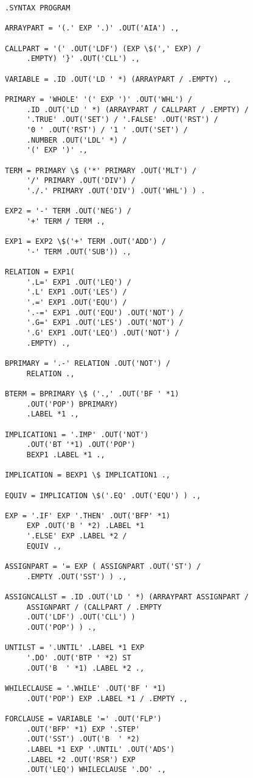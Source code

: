 \documentclass[twocolumn]{article}
\begin{document}
\begin{verbatim}
.SYNTAX PROGRAM

ARRAYPART = '(.' EXP '.)' .OUT('AIA') .,

CALLPART = '(' .OUT('LDF') (EXP \$(',' EXP) /
     .EMPTY) '}' .OUT('CLL') .,

VARIABLE = .ID .OUT('LD ' *) (ARRAYPART / .EMPTY) .,

PRIMARY = 'WHOLE' '(' EXP ')' .OUT('WHL') /
     .ID .OUT('LD ' *) (ARRAYPART / CALLPART / .EMPTY) /
     '.TRUE' .OUT('SET') / '.FALSE' .OUT('RST') /
     '0 ' .OUT('RST') / '1 ' .OUT('SET') /
     .NUMBER .OUT('LDL' *) /
     '(' EXP ')' .,

TERM = PRIMARY \$ ('*' PRIMARY .OUT('MLT') /
     '/' PRIMARY .OUT('DIV') /
     './.' PRIMARY .OUT('DIV') .OUT('WHL') ) .

EXP2 = '-' TERM .OUT('NEG') /
     '+' TERM / TERM .,

EXP1 = EXP2 \$('+' TERM .OUT('ADD') /
     '-' TERM .OUT('SUB')) .,

RELATION = EXP1(
     '.L=' EXP1 .OUT('LEQ') /
     '.L' EXP1 .OUT('LES') /
     '.=' EXP1 .OUT('EQU') /
     '.-=' EXP1 .OUT('EQU') .OUT('NOT') /
     '.G=' EXP1 .OUT('LES') .OUT('NOT') /
     '.G' EXP1 .OUT('LEQ') .OUT('NOT') /
     .EMPTY) .,

BPRIMARY = '.-' RELATION .OUT('NOT') /
     RELATION .,

BTERM = BPRIMARY \$ ('.,' .OUT('BF ' *1)
     .OUT('POP') BPRIMARY)
     .LABEL *1 .,

IMPLICATION1 = '.IMP' .OUT('NOT')
     .OUT('BT '*1) .OUT('POP')
     BEXP1 .LABEL *1 .,

IMPLICATION = BEXP1 \$ IMPLICATION1 .,

EQUIV = IMPLICATION \$('.EQ' .OUT('EQU') ) .,

EXP = '.IF' EXP '.THEN' .OUT('BFP' *1)
     EXP .OUT('B ' *2) .LABEL *1
     '.ELSE' EXP .LABEL *2 /
     EQUIV .,

ASSIGNPART = '= EXP ( ASSIGNPART .OUT('ST') /
     .EMPTY .OUT('SST') ) .,

ASSIGNCALLST = .ID .OUT('LD ' *) (ARRAYPART ASSIGNPART /
     ASSIGNPART / (CALLPART / .EMPTY
     .OUT('LDF') .OUT('CLL') )
     .OUT('POP') ) .,

UNTILST = '.UNTIL' .LABEL *1 EXP
     '.DO' .OUT('BTP ' *2) ST
     .OUT('B  ' *1) .LABEL *2 .,

WHILECLAUSE = '.WHILE' .OUT('BF ' *1)
     .OUT('POP') EXP .LABEL *1 / .EMPTY .,

FORCLAUSE = VARIABLE '=' .OUT('FLP')
     .OUT('BFP' *1) EXP '.STEP'
     .OUT('SST') .OUT('B  ' *2)
     .LABEL *1 EXP '.UNTIL' .OUT('ADS')
     .LABEL *2 .OUT('RSR') EXP
     .OUT('LEQ') WHILECLAUSE '.DO' .,


\end{verbatim}
\end{document}

